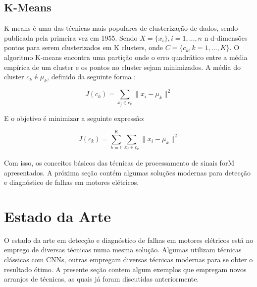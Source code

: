 % 

\subsection{K-Means}

K-means é uma das técnicas mais populares de clusterização de dados, sendo publicada pela primeira vez em 1955. Sendo $X=\{x_i\}, i=1, ..., n$
n d-dimensões pontos para serem clusterizados em K clusters, onde $C = \{c_k, k=1, ..., K\}$. O algoritmo K-means encontra uma partição onde o erro quadrático entre a média 
empírica de um cluster e os pontos no cluster sejam minimizados. A média do cluster $c_k$ é $\mu_k$, definido da seguinte forma \cite{Jain2010}:

\begin{equation}\label{eq:k-means}
    J(c_k) = \sum_{x_j\in c_k} {\parallel x_i-\mu_k \parallel^2}
\end{equation}

E o objetivo é minimizar a seguinte expressão:

\begin{equation}\label{eq:k-means}
    J(c_k) = \sum_{k=1}^{K}\sum_{x_j\in c_k} {\parallel x_i-\mu_k \parallel^2}
\end{equation}

Com isso, os conceitos básicos das técnicas de processamento de sinais forM apresentados. A próxima seção contém algumas soluções
modernas para detecção e diagnóstico de falhas em motores elétricos.


% 

\section{Estado da Arte}

O estado da arte em detecção e diagnóstico de falhas em motores elétricos está no emprego de diversas técnicas numa mesma solução. Algumas 
utilizam técnicas clássicas com CNNs, outras empregam diversas técnicas modernas para se obter o resultado ótimo. A presente seção contem
algum exemplos que empregam novos arranjos de técnicas, as quais já foram discutidas anteriormente.

% 


